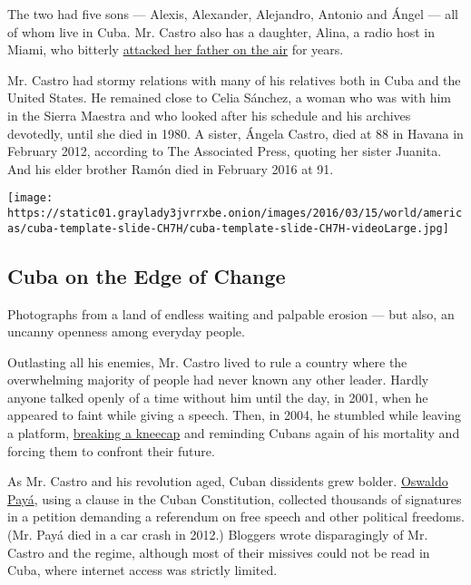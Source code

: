 The two had five sons --- Alexis, Alexander, Alejandro, Antonio and
Ángel --- all of whom live in Cuba. Mr. Castro also has a daughter,
Alina, a radio host in Miami, who bitterly
\href{http://www.nytimes3xbfgragh.onion/2002/03/22/us/on-the-air-in-miami-castro-s-rebellious-daughter.html}{attacked
her father on the air} for years.

Mr. Castro had stormy relations with many of his relatives both in Cuba
and the United States. He remained close to Celia Sánchez, a woman who
was with him in the Sierra Maestra and who looked after his schedule and
his archives devotedly, until she died in 1980. A sister, Ángela Castro,
died at 88 in Havana in February 2012, according to The Associated
Press, quoting her sister Juanita. And his elder brother Ramón died in
February 2016 at 91.

\href{https://www.nytimes3xbfgragh.onion/interactive/2016/03/19/world/americas/cuba-on-the-edge-of-change-photo-essay.html}{}

\texttt{[image: https://static01.graylady3jvrrxbe.onion/images/2016/03/15/world/americas/cuba-template-slide-CH7H/cuba-template-slide-CH7H-videoLarge.jpg]}

\hypertarget{cuba-on-the-edge-of-change}{%
\subsection{Cuba on the Edge of
Change}\label{cuba-on-the-edge-of-change}}

Photographs from a land of endless waiting and palpable erosion --- but
also, an uncanny openness among everyday people.

Outlasting all his enemies, Mr. Castro lived to rule a country where the
overwhelming majority of people had never known any other leader. Hardly
anyone talked openly of a time without him until the day, in 2001, when
he appeared to faint while giving a speech. Then, in 2004, he stumbled
while leaving a platform,
\href{http://www.nytimes3xbfgragh.onion/2004/10/23/international/americas/23cuba.html}{breaking
a kneecap} and reminding Cubans again of his mortality and forcing them
to confront their future.

As Mr. Castro and his revolution aged, Cuban dissidents grew bolder.
\href{http://www.nytimes3xbfgragh.onion/2003/05/20/world/dissident-accuses-cuba-of-manipulating-fear-of-us-invasion.html}{Oswaldo
Payá}, using a clause in the Cuban Constitution, collected thousands of
signatures in a petition demanding a referendum on free speech and other
political freedoms. (Mr. Payá died in a car crash in 2012.) Bloggers
wrote disparagingly of Mr. Castro and the regime, although most of their
missives could not be read in Cuba, where internet access was strictly
limited.


